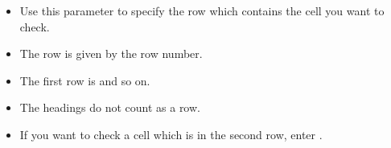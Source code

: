     \begin{itemize}
\item Use this parameter to specify the row which contains the cell you want to check.
\item The row is given by the row number.
\item The first row is  and so on.
\item The headings do not count as a row. 
\item If you want to check a cell which is in the second row, enter . 
\end{itemize}    